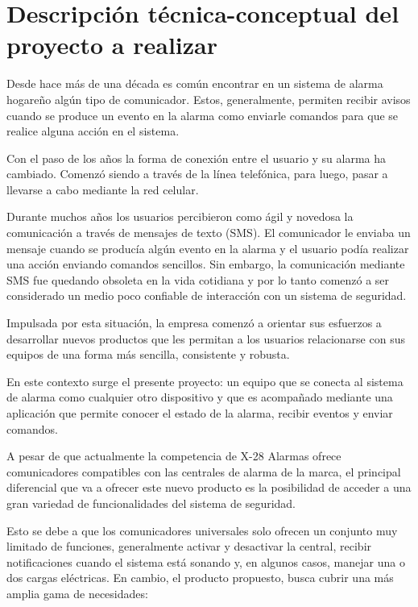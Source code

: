 \documentclass[
11pt, %
codirector, %
]{charter}
\begin{document}
\section{Descripción técnica-conceptual del proyecto a realizar}
\label{sec:descripcion}


Desde hace más de una década es común encontrar en un sistema de alarma hogareño algún tipo de comunicador. Estos, generalmente, permiten recibir avisos cuando se produce un evento en la alarma como enviarle comandos para que se realice alguna acción en el sistema.

Con el paso de los años la forma de conexión entre el usuario y su alarma ha cambiado. Comenzó siendo a través de la línea telefónica, para luego, pasar a llevarse a cabo mediante la red celular. 

Durante muchos años los usuarios percibieron como ágil y novedosa la comunicación a través de mensajes de texto (SMS). El comunicador le enviaba un mensaje cuando se producía algún evento en la alarma y el usuario podía realizar una acción enviando comandos sencillos. Sin embargo, la comunicación mediante SMS fue quedando obsoleta en la vida cotidiana y por lo tanto comenzó a ser considerado un medio poco confiable de interacción con un sistema de seguridad.

Impulsada por esta situación, la empresa comenzó a orientar sus esfuerzos a desarrollar nuevos productos que les permitan a los usuarios relacionarse con sus equipos de una forma más sencilla, consistente y robusta.

En este contexto surge el presente proyecto: un equipo que se conecta al sistema de alarma como cualquier otro dispositivo y que es acompañado mediante una aplicación que permite conocer el estado de la alarma, recibir eventos y enviar comandos.

A pesar de que actualmente la competencia de X-28 Alarmas ofrece comunicadores compatibles con las centrales de alarma de la marca, el principal diferencial que va a ofrecer este nuevo producto es la posibilidad de acceder a una gran variedad de funcionalidades del sistema de seguridad. 

Esto se debe a que los comunicadores universales solo ofrecen un conjunto muy limitado de funciones, generalmente activar y desactivar la central, recibir notificaciones cuando el sistema está sonando y, en algunos casos, manejar una o dos cargas eléctricas. En cambio, el producto propuesto, busca cubrir una más amplia gama de necesidades:
\end{document}
